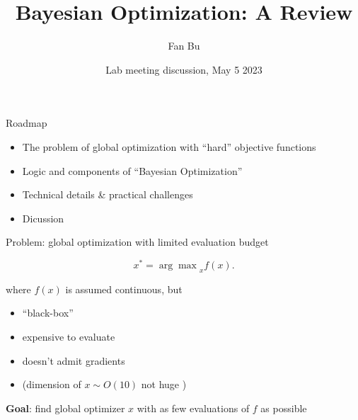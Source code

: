 \documentclass[aspectratio=169]{beamer}					%
\title{Bayesian Optimization: A Review}	%
\author{Fan Bu}			%
\institute{}					%
\date{Lab meeting discussion, May 5 2023}
\begin{document}
\begin{frame}
  \titlepage
\end{frame}




\begin{frame}{Roadmap}

\begin{itemize}
    \item The problem of global optimization with ``hard'' objective functions
    \item Logic and components of ``Bayesian Optimization''
    \item Technical details \& practical challenges
    \item Dicussion
\end{itemize}
    
\end{frame}

\begin{frame}{Problem: global optimization with limited evaluation budget}
	
	\begin{equation*}
		x^* = {\arg \max}_{x} f(x).
	\end{equation*}
\vspace{.5em}
	
	where $f(x)$ is assumed continuous, but
	\begin{itemize}
		\item ``black-box''
		\item expensive to evaluate
		\item doesn't admit gradients
		\item (dimension of $x \sim O(10)$ not huge \cite{frazier2018tutorial})
	\end{itemize}
	
	\pause 
	\vspace{.5em}
	
	
	\textbf{Goal}: find global optimizer $x$ with as few evaluations of $f$ as possible
	
\end{frame}
\end{document}
